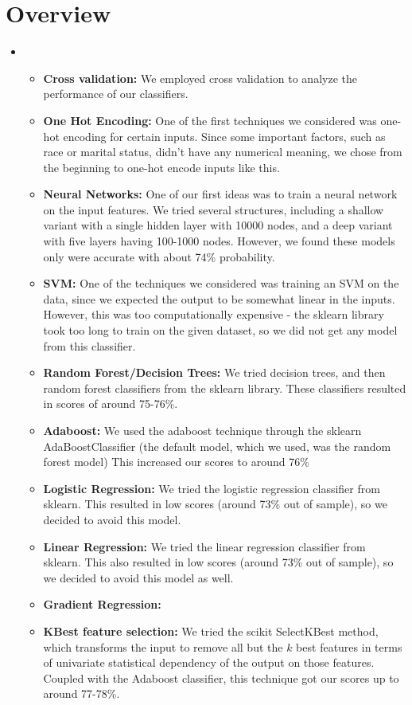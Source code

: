 \section{Overview}
\medskip
\begin{itemize}

    \item {}
    \begin{itemize}
    \item \textbf{Cross validation:} We employed cross validation to analyze the performance of our classifiers.
    \item \textbf{One Hot Encoding:} One of the first techniques we considered was one-hot encoding for certain inputs. Since some important factors, such as race or marital status, didn't have any numerical meaning, we chose from the beginning to one-hot encode inputs like this.
    \item \textbf{Neural Networks:} One of our first ideas was to train a neural network on the input features. We tried several structures, including a shallow variant with a single hidden layer with 10000 nodes, and a deep variant with five layers having 100-1000 nodes. However, we found these models only were accurate with about 74\% probability.
    \item \textbf{SVM:} One of the techniques we considered was training an SVM on the data, since we expected the output to be somewhat linear in the inputs. However, this was too computationally expensive - the sklearn library took too long to train on the given dataset, so we did not get any model from this classifier.
    \item \textbf{Random Forest/Decision Trees:} We tried decision trees, and then random forest classifiers from  the sklearn library. These classifiers resulted in scores of around 75-76\%.
    \item \textbf{Adaboost:} We used the adaboost technique through the sklearn AdaBoostClassifier (the default model, which we used, was the random forest model) This increased our scores to around 76\%
    \item \textbf{Logistic Regression:} We tried the logistic regression classifier from sklearn. This resulted in low scores (around 73\% out of sample), so we decided to avoid this model.
    \item \textbf{Linear Regression:} We tried the linear regression classifier from sklearn. This also resulted in low scores (around 73\% out of sample), so we decided to avoid this model as well.
    \item \textbf{Gradient Regression:} %
    \item \textbf{KBest feature selection:} We tried the scikit SelectKBest method, which transforms the input to remove all but the $k$ best features in terms of univariate statistical dependency of the output on those features. Coupled with the Adaboost classifier, this technique got our scores up to around 77-78\%.



\end{itemize}
\end{itemize}
